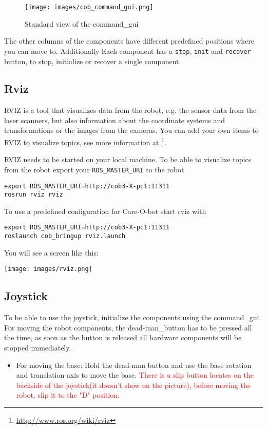 \begin{figure}[ht]
\centering
 \texttt{[image: images/cob\_command\_gui.png]}
 \caption{Standard view of the command\_gui}
 \label{commandgui}
\end{figure}

The other columns of the components have different predefined positions where you can move to. Additionally Each component has a \texttt{stop}, \texttt{init} and \texttt{recover} button, to stop, initialize or recover a single component.

\subsection{Rviz}\label{subsec:rviz}
RVIZ is a tool that visualizes data from the robot, e.g. the sensor data from the laser scanners, but also information about the coordinate systems and transformations or the images from the cameras. You can add your own items to RVIZ to visualize topics, see more information at \footnote{\url{http://www.ros.org/wiki/rviz}}.

RVIZ needs to be started on your local machine. To be able to visualize topics from the robot export your \texttt{ROS\_MASTER\_URI} to the robot
\begin{lstlisting}
export ROS_MASTER_URI=http://cob3-X-pc1:11311
rosrun rviz rviz
\end{lstlisting}

To use a predefined configuration for Care-O-bot start rviz with
\begin{lstlisting}
export ROS_MASTER_URI=http://cob3-X-pc1:11311
roslaunch cob_bringup rviz.launch
\end{lstlisting}

You will see a screen like this:
\begin {center}
\texttt{[image: images/rviz.png]}
\end{center}

\subsection{Joystick}\label{subsec:joystick}
To be able to use the joystick, initialize the components using the command\_gui. For moving the robot components, the dead-man\_button has to be pressed all the time, as soon as the button is released all hardware components will be stopped immediately. 

\begin{itemize}
\item For moving the base: Hold the dead-man button and use the base rotation and translation axis to move the base. \newline
\textcolor{red}{There is a slip button locates on the backside of the joystick(it doesn't show on the picture), before moving the robot, slip it to the "D" position.}
\end{itemize}

